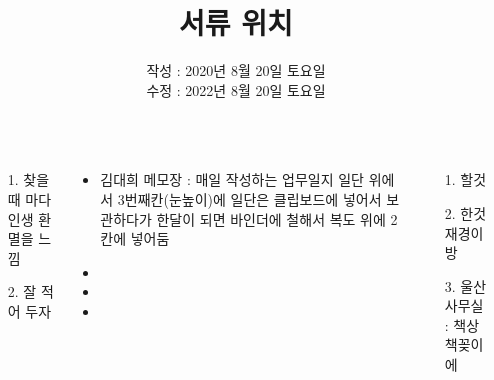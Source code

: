 \documentclass[20pt, a1paper ]{tikzposter}
\title{ 서류 위치 }
\author{ 	작성 : 2020년 8월 20일 토요일 \\
			수정 : 2022년 8월 20일 토요일 }
\begin{document}
	\maketitle

	\begin{columns}


			{
				\begin{large}
					\begin{itemize}
					\item [1.] 찾을 때 마다 인생 환멸을 느낌
					\item [2.]  잘 적어 두자
					\end{itemize}
				\end{large}
			}


		{
			\setlength{\leftmargini}{2em}			
			\setlength{\labelsep}{1em} %

			\begin{large}
			\begin{itemize}
			\item 김대희 메모장 : 매일 작성하는 업무일지
일단 위에서 3번째칸(눈높이)에 일단은 클립보드에 넣어서 보관하다가 한달이 되면
바인더에 철해서 복도 위에 2칸에 넣어둠

			\item 
			\item 
			\item 


			\end{itemize}
			\end{large}

		}

		{
			\setlength{\leftmargini}{5em}			
			\setlength{\labelsep}{1em} %
			\begin{large}
			\begin{itemize}
			\item [1.] 할것 
			\item [2.] 한것 재경이 방
			\item [3.] 울산 사무실 : 책상 책꽂이에 
			\end{itemize}
			\end{large}

}
\end{columns}
\end{document}
